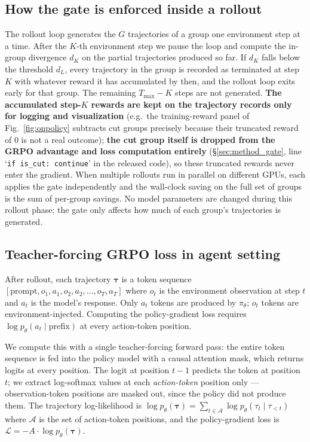 \documentclass{article}
\begin{document}
\subsection{How the gate is enforced inside a rollout}
\label{app:supervisor}

The rollout loop generates the $G$ trajectories of a group one
environment step at a time. After the $K$-th environment step we
pause the loop and compute the in-group divergence $d_K$ on the
partial trajectories produced so far. If $d_K$ falls below the
threshold $d_L$, every trajectory in the group is recorded as
terminated at step $K$ with whatever reward it has accumulated
by then, and the rollout loop exits early for that group. The
remaining $T_{\max} - K$ steps are not generated.
\textbf{The accumulated step-$K$ rewards are kept on the
trajectory records only for logging and visualization} (e.g.\ the
training-reward panel of Fig.~\ref{fig:onpolicy} subtracts cut
groups precisely because their truncated reward of $0$ is not a
real outcome); \textbf{the cut group itself is dropped from the
GRPO advantage and loss computation entirely}
(\S\ref{sec:method_gate}, line `\texttt{if is\_cut: continue}' in
the released code), so these truncated rewards never enter the
gradient. When multiple rollouts run in parallel on different
GPUs, each applies the gate independently and the wall-clock
saving on the full set of groups is the sum of per-group savings.
No model parameters are changed during this rollout phase; the
gate only affects how much of each group's trajectories is
generated.

\subsection{Teacher-forcing GRPO loss in agent setting}
\label{app:teacher_forcing}

After rollout, each trajectory $\boldsymbol\tau$ is a token sequence
$[\text{prompt}, o_1, a_1, o_2, a_2, \ldots, o_T, a_T]$ where $o_t$ is
the environment observation at step $t$ and $a_t$ is the model's
response. Only $a_t$ tokens are produced by $\pi_\theta$; $o_t$ tokens
are environment-injected. Computing the policy-gradient loss requires
$\log p_\theta(a_t \mid \text{prefix})$ at every action-token
position.

We compute this with a single teacher-forcing forward pass: the
entire token sequence is fed into the policy model with a causal
attention mask, which returns logits at every position. The logit
at position $t-1$ predicts
the token at position $t$; we extract log-softmax values at each
\emph{action-token} position only — observation-token positions are
masked out, since the policy did not produce them. The trajectory
log-likelihood is
$\log p_\theta(\boldsymbol\tau)\!=\!\sum_{t \in \mathcal{A}}
\log p_\theta(\tau_t \mid \tau_{<t})$ where $\mathcal{A}$ is the set
of action-token positions, and the policy-gradient loss is
$\mathcal{L} = -A \cdot \log p_\theta(\boldsymbol\tau)$.
\end{document}

